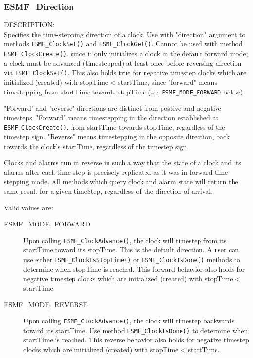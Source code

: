 
\subsubsection{ESMF\_Direction}

{\sf DESCRIPTION:\\}
Specifies the time-stepping direction of a clock.  Use with "direction"
argument to methods {\tt ESMF\_ClockSet()} and {\tt ESMF\_ClockGet()}.
Cannot be used with method {\tt ESMF\_ClockCreate()}, since it only
initializes a clock in the default forward mode; a clock must be advanced
(timestepped) at least once before reversing direction via
{\tt ESMF\_ClockSet()}.  This also holds true for negative timestep clocks
which are initialized (created) with stopTime < startTime, since "forward"
means timestepping from startTime towards stopTime
(see {\tt ESMF\_MODE\_FORWARD} below).

"Forward" and "reverse" directions are distinct from postive and negative
timesteps.  "Forward" means timestepping in the direction established at
{\tt ESMF\_ClockCreate()}, from startTime towards stopTime, regardless
of the timestep sign.  "Reverse" means timestepping in the opposite direction,
back towards the clock's startTime, regardless of the timestep sign.

Clocks and alarms run in reverse in such a way that the state of a clock and
its alarms after each time step is precisely replicated as it was in forward
time-stepping mode.  All methods which query clock and alarm state will
return the same result for a given timeStep, regardless of the direction of
arrival.

Valid values are:
\begin{description}

\item [ESMF\_MODE\_FORWARD] 
      Upon calling {\tt ESMF\_ClockAdvance()}, the clock will timestep from
its startTime toward its stopTime.  This is the default direction.  A user
can use either {\tt ESMF\_ClockIsStopTime()} or {\tt ESMF\_ClockIsDone()}
methods to determine when stopTime is reached.  This forward behavior also
holds for negative timestep clocks which are initialized (created) with
stopTime < startTime.

\item [ESMF\_MODE\_REVERSE] 
      Upon calling {\tt ESMF\_ClockAdvance()}, the clock will timestep backwards
toward its startTime.  Use method {\tt ESMF\_ClockIsDone()} to determine when
startTime is reached.  This reverse behavior also holds for negative timestep
clocks which are initialized (created) with stopTime < startTime.

\end{description}

